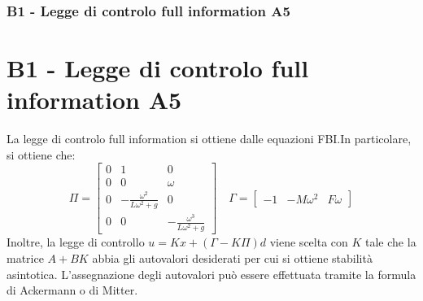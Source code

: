 \documentclass{beamer}
\begin{document}
\begin{frame}
	\frametitle{B1 - Legge di controlo full information A5}%
	\section{B1 - Legge di controlo full information A5}%
	La legge di controlo full information si ottiene dalle equazioni FBI.In particolare, si ottiene che:%
	\begin{equation*}
		\Pi=\begin{bmatrix}
			0&1&0\\0&0&\omega \\0&-\frac{\omega^{2}}{L\omega^{2}+g}&0\\0&0&-\frac{\omega^{3}}{L\omega^{2}+g}
		\end{bmatrix}\quad \Gamma=\begin{bmatrix}
			-1&-M\omega^{2}&F\omega
		\end{bmatrix}
	\end{equation*}
	Inoltre, la legge di controllo \(u=Kx+(\Gamma-K\Pi )d\) viene scelta con \(K\) tale che la matrice \(A+BK\) abbia gli autovalori desiderati per cui si ottiene stabilità asintotica. L'assegnazione degli autovalori può essere effettuata tramite la formula di Ackermann o di Mitter.
\end{frame}
\end{document}

